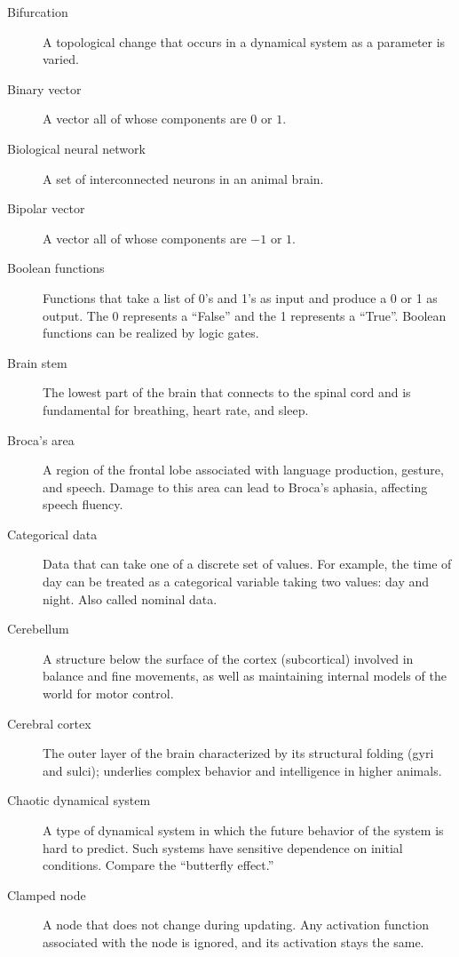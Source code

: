 \begin{description}
\item[Bifurcation] A topological change that occurs in a dynamical system as a parameter is varied.

\item[Binary vector] A vector all of whose components are $0$ or $1$.

\item[Biological neural network] A set of interconnected neurons in an animal brain.

\item[Bipolar vector] A vector all of whose components are $-1$ or $1$.

\item[Boolean functions] Functions that take a list of 0's and 1's as input and produce a 0 or 1 as output. The 0 represents a ``False'' and the 1 represents a ``True''. Boolean functions can be realized by logic gates.

\item[Brain stem] The lowest part of the brain that connects to the spinal cord and is fundamental for breathing, heart rate, and sleep.

\item[Broca's area] A region of the frontal lobe associated with language production, gesture, and speech. Damage to this area can lead to Broca's aphasia, affecting speech fluency.

\item[Categorical data] Data that can take one of a discrete set of values. For example, the time of day can be treated as a categorical variable taking two values: day and night. Also called nominal data.

\item[Cerebellum] A structure below the surface of the cortex (subcortical) involved in balance and fine movements, as well as maintaining internal models of the world for motor control.

\item[Cerebral cortex] The outer layer of the brain characterized by its structural folding (gyri and sulci); underlies complex behavior and intelligence in higher animals. 

\item[Chaotic dynamical system] A type of dynamical system in which the future behavior of the system is hard to predict. Such systems have sensitive dependence on initial conditions. Compare the ``butterfly effect.''

\item[Clamped node] A node that does not change during updating. Any activation function associated with the node is ignored, and its activation stays the same.


\end{description}
